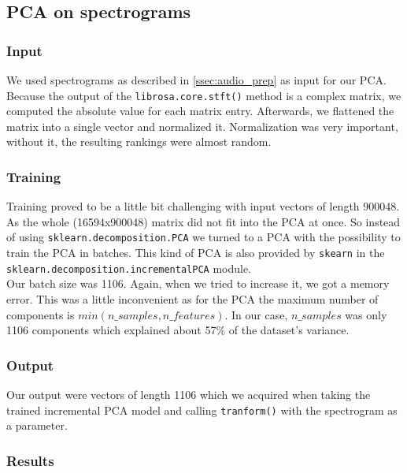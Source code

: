 \subsection {PCA on spectrograms}

\subsubsection{Input}
We used spectrograms as described in \ref{ssec:audio_prep} as input for our PCA. Because the output of the \texttt{librosa.core.stft()} method is a complex matrix, we computed the absolute value for each matrix entry. Afterwards, we flattened the matrix into a single vector and normalized it. Normalization was very important, without it, the resulting rankings were almost random.

\subsubsection{Training}
Training proved to be a little bit challenging with input vectors of length 900048. As the whole (16594x900048) matrix did not fit into the PCA at once. So instead of using \texttt{sklearn.decomposition.PCA} we turned to a PCA with the possibility to train the PCA in batches. This kind of PCA is also provided by \texttt{skearn} in the \texttt{sklearn.decomposition.incrementalPCA} module. \\ Our batch size was 1106. Again, when we tried to increase it, we got a memory error. This was a little inconvenient as for the PCA the maximum number of components is $min(n\_samples, n\_features)$. In our case, $n\_samples$ was only 1106 components which explained about 57\% of the dataset's variance.

\subsubsection{Output}
Our output were vectors of length 1106 which we acquired when taking the trained incremental PCA model and calling \texttt{tranform()} with the spectrogram as a parameter.

\subsubsection{Results}

